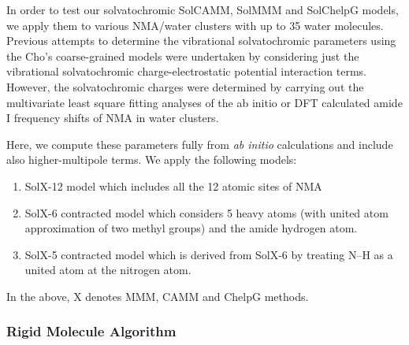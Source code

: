 \documentclass[a4paper,titlepage,twoside,fleqn,12pt]{book}
\begin{document}
\begin{refsection}
In order to test our solvatochromic SolCAMM, SolMMM and SolChelpG models,
we apply them to various NMA/water clusters
with up to 35 water molecules. Previous attempts \citep{Lee.Choi.Cho.JCP.2012}
to determine the vibrational solvatochromic parameters using the Cho's
coarse\hyp{}grained models were undertaken by considering just the 
vibrational solvatochromic charge\hyp{}electrostatic potential
interaction terms. However, the solvatochromic charges
were determined by carrying out the multivariate
least square fitting analyses of the ab initio or DFT calculated
amide I frequency shifts of NMA in water clusters. 

Here, we compute these
parameters fully from \emph{ab initio} calculations and include also 
higher\hyp{}multipole terms. We apply the following models:
%
\begin{enumerate}
 \item SolX-12 model which includes all the 12 atomic sites of NMA
 \item SolX-6 contracted model which considers 5 heavy atoms (with united
       atom approximation of two methyl groups) and the
       amide hydrogen atom.
 \item SolX-5 contracted model which is derived from SolX-6 by treating N--H
       as a united atom at the nitrogen atom.
\end{enumerate}
%
In the above, X denotes MMM, CAMM and ChelpG methods. 

\subsubsection{Rigid Molecule Algorithm\label{s:rigid-molecule-algorithm}}


\end{refsection}
\end{document}
